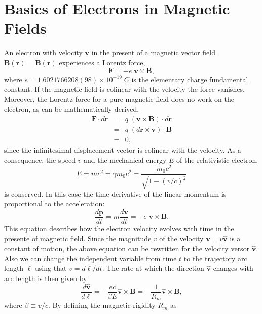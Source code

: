 \documentclass[../sands-adaptation.tex]{subfiles}
\begin{document}
\section{Basics of Electrons in Magnetic Fields}

An electron with velocity $\bm{v}$ in the present of a magnetic vector field $\bm{B}(\bm{r}) = \bm{B}(\bm{r})$ experiences a Lorentz force, 
\begin{equation}
\bm{F} = - e \; \bm{v} \times \bm{B},
\end{equation}
where $e = 1.6021766208(98)\times10^{-19}\;C$ is the elementary charge fundamental constant. If the magnetic field is colinear with the velocity the force vanishes. Moreover, the Lorentz force for a pure magnetic field does no work on the electron, as can be mathematically derived,
\begin{eqnarray}
\bm{F} \cdot d\bm{r} &=& q \; \left( \bm{v} \times \bm{B} \right) \cdot d\bm{r} \nonumber \\
                     &=& q \; \left( d\bm{r} \times \bm{v} \right) \cdot \bm{B} \\
                     &=& 0 \nonumber,
\end{eqnarray}
since the infinitesimal displacement vector is colinear with the velocity. As a consequence, the speed $v$ and the mechanical energy $E$ of the relativistic electron,
\begin{equation}
E = m c^2 = \gamma m_0 c^2 = \frac{m_0 c^2}{\sqrt{1-(v/c)^2}}
\end{equation}
is conserved. In this case the time derivative of the linear momentum is proportional to the acceleration:
\begin{equation}
\frac{d\bm{p}}{dt} = m \frac{d\bm{v}}{dt} = - e \; \bm{v} \times \bm{B}. 
\end{equation}
This equation describes how the electron velocity evolves with time in the presente of magnetic field. Since the magnitude $v$ of the velocity $\bm{v} = v\bm{\hat{v}}$ is a constant of motion, the above equation can be rewritten for the velocity versor $\bm{\hat{v}}$. Also we can change the independent variable from time $t$ to the trajectory arc length $\ell$ using that $v = d\ell/dt$. The rate at which the direction $\bm{\hat{v}}$ changes with arc length is then given by
\begin{equation}
\frac{d\bm{\hat{v}}}{d\ell} = - \frac{ec}{\beta E} \bm{\hat{v}} \times \bm{B} = -\frac{1}{R_m} \bm{\hat{v}} \times \bm{B},
\end{equation}
where $\beta \equiv v/c$. By defining the magnetic rigidity $R_m$ as
\end{document}
